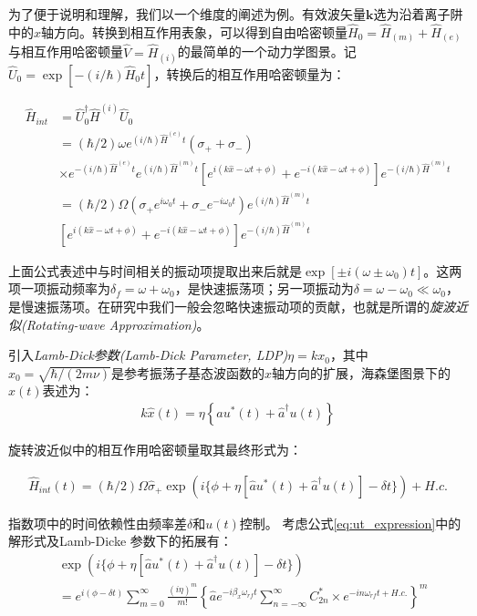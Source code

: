 为了便于说明和理解，我们以一个维度的阐述为例。有效波矢量$\mathbf{k}$选为沿着离子阱中的$x$轴方向。转换到相互作用表象，可以得到自由哈密顿量$\hat{H}_0=\hat{H}_{(m)}+\hat{H}_{(e)}$与相互作用哈密顿量$\hat{V}=\hat{H}_{(i)}$的最简单的一个动力学图景。记$\hat{U}_0=\exp[-(i/\hbar)\hat{H}_0t]$，转换后的相互作用哈密顿量为：

\begin{align}
    \hat{H}_{int} &=\hat{U}_0^\dagger\hat{H}^{(i)}\hat{U}_0\\
    &=(\hbar/2)\omega e^{(i/\hbar)\hat{H}^{(e)}t}(\sigma_++\sigma_-)\\
    &\times e^{-(i/\hbar)\hat{H}^{(e)}t}e^{(i/\hbar)\hat{H}^{(m)}t}\left[e^{i(k\hat{x}-\omega t + \phi)}+e^{-i(k\hat{x}-\omega t + \phi)}\right]e^{-(i/\hbar)\hat{H}^{(m)}t}\\
    &=(\hbar/2)\Omega(\sigma_+e^{i\omega_0 t}+\sigma_-e^{-i\omega_0 t}) e^{(i/\hbar)\hat{H}^{(m)}t} \\
    &\left[e^{i(k\hat{x}-\omega t + \phi)}+e^{-i(k\hat{x}-\omega t + \phi)}\right]e^{-(i/\hbar)\hat{H}^{(m)}t}
\end{align}

上面公式表述中与时间相关的振动项提取出来后就是$\exp[\pm i (\omega\pm \omega_0)t]$。这两项一项振动频率为$\delta_f=\omega+\omega_0$，是快速振荡项；另一项振动为$\delta=\omega-\omega_0\ll \omega_0$，是慢速振荡项。在研究中我们一般会忽略快速振动项的贡献，也就是所谓的\emph{旋波近似(Rotating-wave Approximation)}。

引入\emph{Lamb-Dick参数(Lamb-Dick Parameter, LDP)}$\eta=kx_0$，其中$x_0=\sqrt{\hbar/(2m\nu)}$是参考振荡子基态波函数的$x$轴方向的扩展，海森堡图景下的$\hat{x}(t)$表述为：
\begin{align}
    k\hat{x}(t)=\eta\left\{\hat{a}u^*(t)+\hat{a}^\dagger u(t)\right\}
\end{align}

旋转波近似中的相互作用哈密顿量取其最终形式为：

\begin{align}
    \hat{H}_{int}(t)=(\hbar/2)\Omega\hat{\sigma}_+ \exp(i\{\phi+\eta[\hat{a}u^*(t)+\hat{a}^\dagger u(t)]-\delta t\})+H.c.
\end{align}

指数项中的时间依赖性由频率差$\delta$和$u(t)$控制。
考虑公式\eqref{eq:ut_expression}中的解形式及Lamb-Dicke 参数下的拓展有：
\begin{align}
    &\exp(i\{\phi + \eta [\hat{a}u^*(t)+\hat{a}^\dagger u(t)]-\delta t\})\\
    &=e^{i(\phi-\delta t)}\sum_{m=0}^{\infty} \frac{(i\eta)^m}{m!}\left\{\hat{a}e^{-i\beta_x\omega_{rf}t} \sum_{n=-\infty}^{\infty}C_{2n}^* \times e^{-i n\omega_{rf}t+H.c.}\right\}^m
\end{align}

